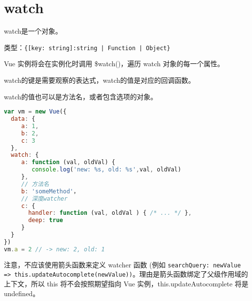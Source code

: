 \begin{lstlisting}[language=JavaScript]

\end{lstlisting}




\begin{lstlisting}[language=JavaScript]

\end{lstlisting}




\begin{lstlisting}[language=JavaScript]

\end{lstlisting}






\section{watch}

watch是一个对象。

\begin{compactitem}
\item 类型：\texttt{\{[key: string]:string | Function | Object\}}
\end{compactitem}



Vue 实例将会在实例化时调用 \$watch()，遍历 watch 对象的每一个属性。

\begin{compactitem}
\item watch的键是需要观察的表达式，watch的值是对应的回调函数。
\item watch的值也可以是方法名，或者包含选项的对象。
\end{compactitem}


\begin{lstlisting}[language=JavaScript]
var vm = new Vue({
  data: {
     a: 1,
     b: 2,
     c: 3
  },
  watch: {
     a: function (val, oldVal) {
        console.log('new: %s, old: %s',val, oldVal)
     },
     // 方法名
     b: 'someMethod'，
     // 深度watcher
     c: {
       handler: function (val, oldVal ) { /* ... */ },
       deep: true
     }
  }
})
vm.a = 2 // -> new: 2, old: 1
\end{lstlisting}

注意，不应该使用箭头函数来定义 watcher 函数 (例如 \texttt{searchQuery: newValue => this.updateAutocomplete(newValue))}。理由是箭头函数绑定了父级作用域的上下文，所以 this 将不会按照期望指向 Vue 实例，this.updateAutocomplete 将是 undefined。


